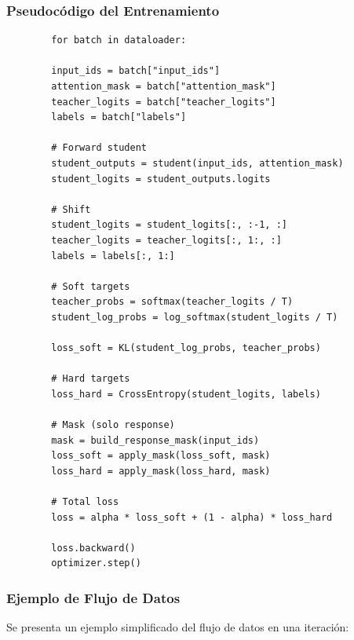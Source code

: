 \documentclass[12pt]{article}
\begin{document}
	
	\subsubsection{Pseudocódigo del Entrenamiento}
	
	\begin{verbatim}
		for batch in dataloader:
		
		input_ids = batch["input_ids"]
		attention_mask = batch["attention_mask"]
		teacher_logits = batch["teacher_logits"]
		labels = batch["labels"]
		
		# Forward student
		student_outputs = student(input_ids, attention_mask)
		student_logits = student_outputs.logits
		
		# Shift
		student_logits = student_logits[:, :-1, :]
		teacher_logits = teacher_logits[:, 1:, :]
		labels = labels[:, 1:]
		
		# Soft targets
		teacher_probs = softmax(teacher_logits / T)
		student_log_probs = log_softmax(student_logits / T)
		
		loss_soft = KL(student_log_probs, teacher_probs)
		
		# Hard targets
		loss_hard = CrossEntropy(student_logits, labels)
		
		# Mask (solo response)
		mask = build_response_mask(input_ids)
		loss_soft = apply_mask(loss_soft, mask)
		loss_hard = apply_mask(loss_hard, mask)
		
		# Total loss
		loss = alpha * loss_soft + (1 - alpha) * loss_hard
		
		loss.backward()
		optimizer.step()
	\end{verbatim}
	

	
	\subsubsection{Ejemplo de Flujo de Datos}
	
	Se presenta un ejemplo simplificado del flujo de datos en una iteración:
	
\end{document}
